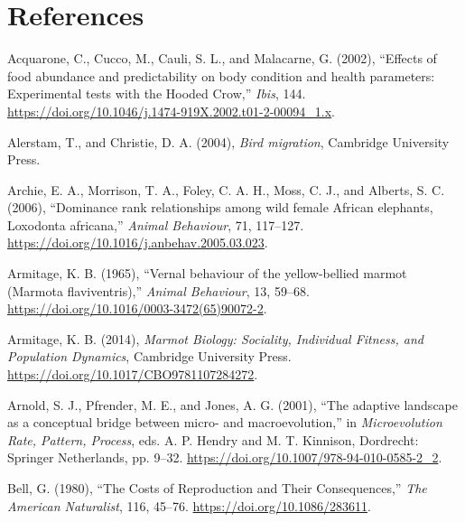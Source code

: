 \documentclass[
  12pt,
  letterpaper,
]{scrartcl}
\newlength{\cslhangindent}
\newenvironment{CSLReferences}[2] %
 {\begin{list}{}{%
  \setlength{\itemindent}{0pt}
  \setlength{\leftmargin}{0pt}
  \setlength{\parsep}{0pt}
  \ifodd #1
   \setlength{\leftmargin}{\cslhangindent}
   \setlength{\itemindent}{-1\cslhangindent}
  \fi
  \setlength{\itemsep}{#2\baselineskip}}}
 {\end{list}}
\begin{document}
\newpage{}

\section{References}\label{references}

\label{refs}
\begin{CSLReferences}{1}{0}
Acquarone, C., Cucco, M., Cauli, S. L., and Malacarne, G. (2002),
{``Effects of food abundance and predictability on body condition and
health parameters: {Experimental} tests with the {Hooded Crow},''}
\emph{Ibis}, 144.
\url{https://doi.org/10.1046/j.1474-919X.2002.t01-2-00094_1.x}.

Alerstam, T., and Christie, D. A. (2004), \emph{Bird migration},
Cambridge University Press.

Archie, E. A., Morrison, T. A., Foley, C. A. H., Moss, C. J., and
Alberts, S. C. (2006), {``Dominance rank relationships among wild female
{African} elephants, {Loxodonta} africana,''} \emph{Animal Behaviour},
71, 117--127. \url{https://doi.org/10.1016/j.anbehav.2005.03.023}.

Armitage, K. B. (1965), {``Vernal behaviour of the yellow-bellied marmot
({Marmota} flaviventris),''} \emph{Animal Behaviour}, 13, 59--68.
\url{https://doi.org/10.1016/0003-3472(65)90072-2}.

Armitage, K. B. (2014), \emph{Marmot {Biology}: {Sociality}, {Individual
Fitness}, and {Population Dynamics}}, Cambridge University Press.
\url{https://doi.org/10.1017/CBO9781107284272}.

Arnold, S. J., Pfrender, M. E., and Jones, A. G. (2001), {``The adaptive
landscape as a conceptual bridge between micro- and macroevolution,''}
in \emph{Microevolution {Rate}, {Pattern}, {Process}}, eds. A. P. Hendry
and M. T. Kinnison, Dordrecht: Springer Netherlands, pp. 9--32.
\url{https://doi.org/10.1007/978-94-010-0585-2_2}.

Bell, G. (1980), {``The {Costs} of {Reproduction} and {Their
Consequences},''} \emph{The American Naturalist}, 116, 45--76.
\url{https://doi.org/10.1086/283611}.


\end{CSLReferences}
\end{document}
